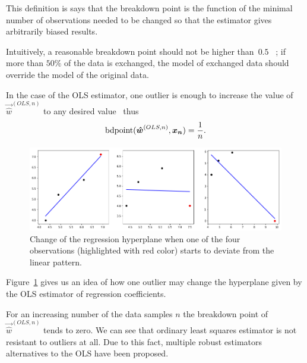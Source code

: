 This definition is says that the breakdown point is the function of the minimal number of observations needed to be changed so that the estimator gives arbitrarily biased results.

Intuitively, a reasonable breakdown point should not be higher than~$0.5$~\cite{rouss:1986} ; if more than $50\%$ of the data is exchanged, the model of exchanged data should override the model of the original data. 

In the case of the OLS estimator, one outlier is enough to increase the value of $\vec{\hat{w}}^{(OLS,n)}$ to any desired value~\cite{agullo2001new} thus 
\begin{equation}
    \operatorname{bdpoint}(\boldsymbol{\hat{w}}^{(OLS,n)},\boldsymbol{x_n} ) = \frac{1}{n}.
\end{equation}

\begin{figure}[h]
    \centering
    \includegraphics[width=12cm]{img/outlier_regression}
    \caption{Change of the regression hyperplane when one of the four observations (highlighted with red color) starts to deviate from the linear pattern.}
    \label{figure:outlier:hyperplane}
\end{figure}

Figure~\ref{figure:outlier:hyperplane} gives us an idea of how one outlier may change the hyperplane given by the OLS estimator of regression coefficients.



    

For an increasing number of the data samples $n$ the breakdown point of $\vec{\hat{w}}^{(OLS,n)}$ tends to zero. We can see that ordinary least squares estimator is not resistant to outliers at all. Due to this fact, multiple robust estimators alternatives to the OLS have been proposed.




